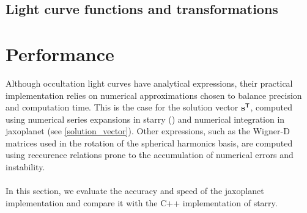 \documentclass[modern]{aastex631}
\begin{document}
\subsection{Light curve functions and transformations}
\todo{}

\section{Performance}\label{performance}
Although occultation light curves have analytical expressions, their practical implementation relies on numerical approximations chosen to balance precision and computation time. This is the case for the solution vector ${\mathbf{s}}^\mathsf{T}$, computed using numerical series expansions in \textsf{starry} (\citealt[section D.2.3]{starry}) and numerical integration in \textsf{jaxoplanet} (see \autoref{solution_vector}). Other expressions, such as the Wigner-D matrices used in the rotation of the spherical harmonics basis, are computed using reccurence relations prone to the accumulation of numerical errors and instability.\\\\
In this section, we evaluate the accuracy and speed of the \textsf{jaxoplanet} implementation and compare it with the C++ implementation of \textsf{starry}.
\end{document}
